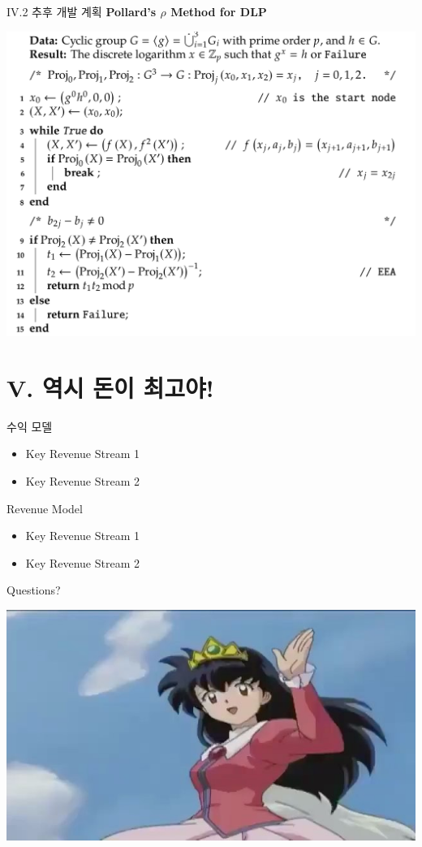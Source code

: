 \documentclass{beamer}
\begin{document}
\begin{frame}{IV.2 추후 개발 계획}
	\alert{\bf Pollard's $\rho$ Method for DLP}\\
	\begin{center}
		\includegraphics[scale=.225]{rho.png}
	\end{center}
\end{frame}

\section{V. 역시 돈이 최고야!}
\begin{frame}{수익 모델}
	\begin{itemize}[<+->]
		\item Key Revenue Stream 1
		\item Key Revenue Stream 2
	\end{itemize}
\end{frame}

\begin{frame}{Revenue Model}
	\begin{itemize}[<+->]
		\item Key Revenue Stream 1
		\item Key Revenue Stream 2
	\end{itemize}
\end{frame}

\begin{frame}{Questions?}
	\begin{center}
		\includegraphics[scale=.35]{end.jpg}
	\end{center}
\end{frame}
\end{document}
